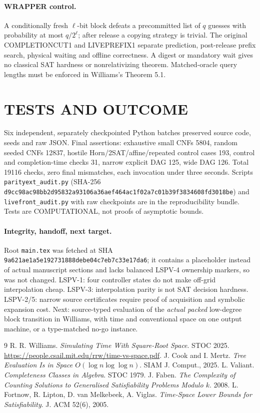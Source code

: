 \documentclass[11pt]{article}
\begin{document}
\paragraph{WRAPPER control.}
A conditionally fresh $\ell$-bit block defeats a precommitted list of $q$ guesses with probability at most $q/2^\ell$; after release a copying strategy is trivial. The original COMPLETIONCUT1 and LIVEPREFIX1 separate prediction, post-release prefix search, physical waiting and offline correctness. A digest or mandatory wait gives no classical SAT hardness or nonrelativizing theorem. Matched-oracle query lengths must be enforced in Williams's Theorem 5.1.
\section{TESTS AND OUTCOME}
Six independent, separately checkpointed Python batches preserved source code, seeds and raw JSON. Final assertions: exhaustive small CNFs 5804, random seeded CNFs 12837, hostile Horn/2SAT/affine/repeated control cases 193, control and completion-time checks 31, narrow explicit DAG 125, wide DAG 126. Total 19116 checks, zero final mismatches, each invocation under three seconds. Scripts \texttt{parityext\_audit.py} (SHA-256 \texttt{d9cc98ac98bb2d95832a93106a36aef464ac1f02a7c01b39f3834608fd3018be}) and \texttt{livefront\_audit.py} with raw checkpoints are in the reproducibility bundle. Tests are COMPUTATIONAL, not proofs of asymptotic bounds.
\paragraph{Integrity, handoff, next target.}
Root \texttt{main.tex} was fetched at SHA \texttt{9a621ae1a5e192731888debe04c7eb7c33e17da6}; it contains a placeholder instead of actual manuscript sections and lacks balanced LSPV-4 ownership markers, so was not changed. LSPV-1: four controller states do not make off-grid interpolation cheap. LSPV-3: interpolation parity is not SAT decision hardness. LSPV-2/5: narrow source certificates require proof of acquisition and symbolic expansion cost. Next: source-typed evaluation of the \emph{actual packed} low-degree block transition in Williams, with time and conventional space on one output machine, or a type-matched no-go instance.
\begin{thebibliography}{9}
 R. R. Williams. \emph{Simulating Time With Square-Root Space}. STOC 2025. \url{https://people.csail.mit.edu/rrw/time-vs-space.pdf}.
 J. Cook and I. Mertz. \emph{Tree Evaluation Is in Space $O(\log n\log\log n)$}. SIAM J. Comput., 2025.
 L. Valiant. \emph{Completeness Classes in Algebra}. STOC 1979.
 J. Faben. \emph{The Complexity of Counting Solutions to Generalised Satisfiability Problems Modulo $k$}. 2008.
 L. Fortnow, R. Lipton, D. van Melkebeek, A. Viglas. \emph{Time-Space Lower Bounds for Satisfiability}. J. ACM 52(6), 2005.
\end{thebibliography}
\end{document}
